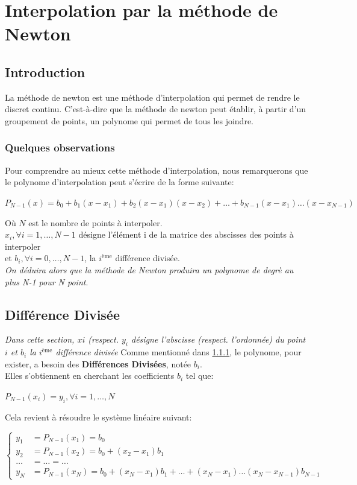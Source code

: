 \documentclass{report}
\begin{document}
\section{Interpolation par la méthode de Newton}
\subsection{Introduction}
La méthode de newton est une méthode d'interpolation qui permet de rendre le discret continu. C'est-à-dire que la méthode de newton peut établir, à partir d'un groupement de points, un polynome qui permet de tous les joindre. \\
\subsubsection{Quelques observations} \label{obs}
Pour comprendre au mieux cette méthode d'interpolation, nous remarquerons que le polynome d'interpolation peut s'écrire de la forme suivante:\\
\begin{center}
$P_{N-1}(x) = b_0 + b_1 (x-x_1) + b_2(x-x_1)(x-x_2)+ \ldots+b_{N-1}(x-x_1)\ldots(x-x_{N-1})$
\end{center}
Où $N$ est le nombre de points à interpoler. \\
$x_i, \forall i = 1,\ldots,N-1$ désigne l'élément i de la matrice des abscisses des points à interpoler  \\
et $b_i, \forall i=0,\ldots, N-1$, la $i^{\text{ème}}$ différence divisée. \\
\textit{On déduira alors que la méthode de Newton produira un polynome de degrè au plus N-1 pour N point}.\\


\subsection{Différence Divisée}
\textit{Dans cette section, $xi$ (respect. $y_i$ désigne l'abscisse (respect. l'ordonnée) du point $i$ et $b_i$ la $i^{\text{ème}}$ différence divisée}
Comme mentionné dans \ref{obs}, le polynome, pour exister, a besoin des \textbf{Différences Divisées}, notée \textit{$b_i$}.\\
Elles s'obtiennent en cherchant les coefficients $b_i$ tel que:
\begin{center}
$P_{N-1}(x_i) = y_i, \forall i=1,\ldots,N$
\end{center}
Cela revient à résoudre le système linéaire suivant:
\begin{center}
$
\begin{cases}
y_1 & = P_{N-1}(x_1) = b_0 \\
y_2 & = P_{N-1}(x_2) = b_0 + (x_2 - x_1) b_1 \\
\ldots&= \ldots  = \ldots \\
y_N &= P_{N-1}(x_N)= b_0 + (x_N - x_1)b_1+\ldots+(x_N-x_1)\ldots(x_N-x_{N-1})b_{N-1}
\end{cases}
$
\end{center}
\end{document}
